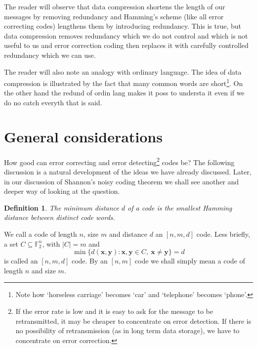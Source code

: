 \documentclass[12pt,a4paper]{article}
\theoremstyle{plain}
\newtheorem{definition}[theorem]{Definition}
\theoremstyle{definition}
\begin{document}
    The reader will observe that data compression
    shortens the length of our messages by
    removing redundancy and Hamming's scheme
    (like all error correcting codes) lengthens
    them by introducing redundancy. This is true,
    but data compression removes redundancy which we
    do not control and which is not useful
    to us and error correction coding then
    replaces it with carefully controlled
    redundancy which we can use.

    The reader will also note an analogy with ordinary language.
    The idea of data compression is illustrated by the
    fact that many common words
    are short\footnote{Note how `horseless carriage'
    becomes `car' and `telephone' becomes `phone'.}.
    On the other hand the redund of ordin lang
    makes it poss to understa it even if we do
    no catch everyth that is said.
    \section{General considerations} How good
    can error correcting and error
    detecting\footnote{If the error rate is low and it is easy
    to ask for the message to be retransmitted, it may be
    cheaper to concentrate on error detection. If there is
    no possibility of retransmission (as in long term data storage),
    we have to concentrate on error correction.}
    codes be? The following discussion is a natural
    development of the ideas we have already
    discussed. Later, in our discussion of Shannon's noisy coding
    theorem we shall see another
    and deeper way
    of looking at the question.
    \begin{definition}
        The minimum distance $d$
        of a code is the smallest Hamming distance
        between distinct code words.
    \end{definition}
    We call a code of length $n$, size $m$ and
    distance $d$ an $[n,m,d]$ code. Less briefly,
    a set $C\subseteq{\mathbb F}_{2}^{n}$,
    with $|C|=m$ and
    \[\min\{d({\mathbf x},{\mathbf y}):
    {\mathbf x},{\mathbf y}\in C,\ {\mathbf x}\neq{\mathbf y}\}
    =d\]
    is called an $[n,m,d]$ code. By an $[n,m]$ code
    we shall simply mean a code of length $n$
    and size $m$.
\end{document}
